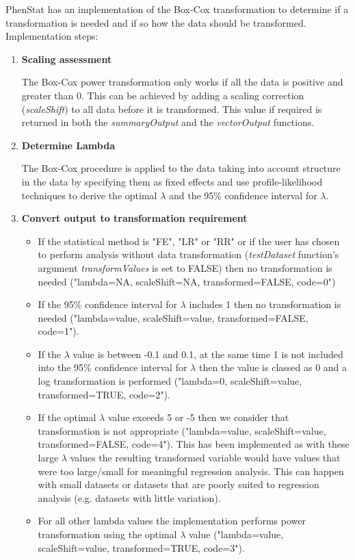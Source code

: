 \documentclass[12pt,a4paper]{article}
\begin{document}
PhenStat has an implementation of the Box-Cox transformation to determine if a transformation is needed and if so how the data should be transformed. 
Implementation steps:
\begin{enumerate}
\item  \textbf{Scaling assessment}

The Box-Cox power transformation only works if all the data is positive and greater than 0. This can be achieved by adding a scaling correction (\textit{scaleShift}) to all data before it is transformed. This value if required is returned in both the \textit{summaryOutput} and the \textit{vectorOutput} functions. 
\item \textbf{Determine Lambda}

The Box-Cox procedure is applied to the data taking into account structure in the data by specifying them as fixed effects and use profile-likelihood techniques to derive the optimal $\lambda$ and the 95\% confidence interval for $\lambda$.
\item  \textbf{Convert output to transformation requirement}
\begin{itemize}
\item If the statistical method is "FE", "LR" or "RR" or if the user has chosen to perform analysis without data transformation (\textit{testDataset} function's argument \textit{transformValues} is set to FALSE) then no transformation is needed ("lambda=NA, scaleShift=NA, transformed=FALSE, code=0")
\item If the 95\% confidence interval for $\lambda$ includes 1 then no transformation is needed ("lambda=value, scaleShift=value, transformed=FALSE, code=1").
\item If the $\lambda$ value is between -0.1 and 0.1, at the same time 1 is not included into the 95\% confidence interval for $\lambda$ then the value is classed as 0 and a log transformation is performed ("lambda=0, scaleShift=value, transformed=TRUE, code=2"). 
\item If the optimal $\lambda$ value exceeds 5 or -5 then we consider that transformation is not appropriate ("lambda=value, scaleShift=value, transformed=FALSE, code=4"). 
This has been implemented as with these large $\lambda$ values the resulting transformed variable would have values that were too large/small for meaningful regression analysis. This can happen with small datasets or datasets that are poorly suited to regression analysis (e.g. datasets with little variation). 
\item For all other lambda values the implementation performs power transformation using  the optimal $\lambda$ value ("lambda=value, scaleShift=value, transformed=TRUE, code=3").  
\end{itemize}
\end{enumerate}
\end{document}
